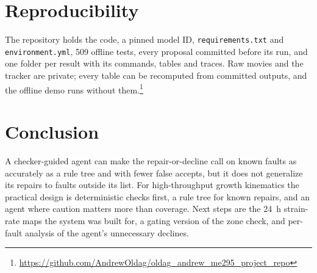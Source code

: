 \documentclass[conference]{IEEEtran}
\begin{document}
\section{Reproducibility}
The repository holds the code, a pinned model ID, \texttt{requirements.txt} and \texttt{environment.yml}, 509 offline tests, every proposal committed before its run, and one folder per result with its commands, tables and traces. Raw movies and the tracker are private; every table can be recomputed from committed outputs, and the offline demo runs without them.\footnote{\url{https://github.com/AndrewOldag/oldag_andrew_me295_project_repo}}

\section{Conclusion}
A checker-guided agent can make the repair-or-decline call on known faults as accurately as a rule tree and with fewer false accepts, but it does not generalize its repairs to faults outside its list. For high-throughput growth kinematics the practical design is deterministic checks first, a rule tree for known repairs, and an agent where caution matters more than coverage. Next steps are the 24~h strain-rate maps the system was built for, a gating version of the zone check, and per-fault analysis of the agent's unnecessary declines.




\appendix
\end{document}
